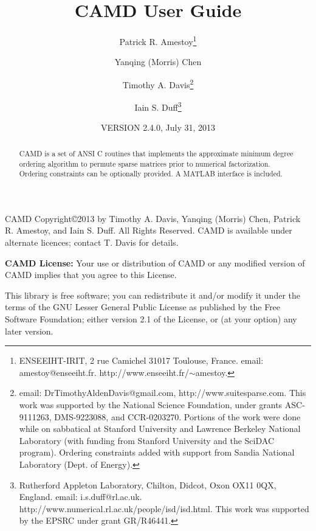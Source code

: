 \documentclass[11pt]{article}
\begin{document}

\title{CAMD User Guide}
\author{Patrick R. Amestoy\thanks{ENSEEIHT-IRIT,
2 rue Camichel 31017 Toulouse, France.
email: amestoy@enseeiht.fr.  http://www.enseeiht.fr/$\sim$amestoy.}
\and Yanqing (Morris) Chen
\and Timothy A. Davis\thanks{
email: DrTimothyAldenDavis@gmail.com,
http://www.suitesparse.com.
This work was supported by the National
Science Foundation, under grants ASC-9111263, DMS-9223088, and CCR-0203270.
Portions of the work were done while on sabbatical at Stanford University
and Lawrence Berkeley National Laboratory (with funding from Stanford
University and the SciDAC program).  Ordering constraints added with
support from Sandia National Laboratory (Dept. of Energy).
}
\and Iain S. Duff\thanks{Rutherford Appleton Laboratory, Chilton, Didcot, 
Oxon OX11 0QX, England. email: i.s.duff@rl.ac.uk.  
http://www.numerical.rl.ac.uk/people/isd/isd.html.
This work was supported by the EPSRC under grant GR/R46441.
}}

\date{VERSION 2.4.0, July 31, 2013}
\maketitle

\begin{abstract}
CAMD is a set of ANSI C routines that implements the approximate minimum degree
ordering algorithm to permute sparse matrices prior to
numerical factorization.  Ordering constraints can be optionally provided.
A MATLAB interface is included.
\end{abstract}

CAMD Copyright\copyright 2013 by Timothy A.  Davis,
Yanqing (Morris) Chen,
Patrick R. Amestoy, and Iain S. Duff.  All Rights Reserved.
CAMD is available under alternate licences; contact T. Davis for details.

{\bf CAMD License:}
    Your use or distribution of CAMD or any modified version of
    CAMD implies that you agree to this License.

    This library is free software; you can redistribute it and/or
    modify it under the terms of the GNU Lesser General Public
    License as published by the Free Software Foundation; either
    version 2.1 of the License, or (at your option) any later version.
\end{document}

